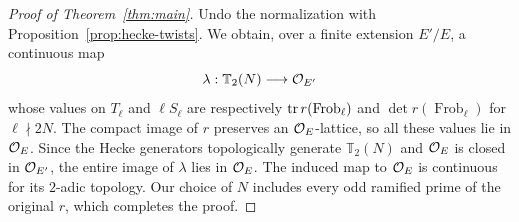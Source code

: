 \begin{proof}[Proof of Theorem~\ref{thm:main}]
Undo the normalization with Proposition~\ref{prop:hecke-twists}.
We obtain, over a finite extension $E'/E$, a continuous map
\[
 \lambda:\mathbb T_2(N)\longrightarrow\mathcal O_{E'}
\]
whose values on $T_\ell$ and $\ell S_\ell$ are respectively
$\operatorname{tr} r(\operatorname{Frob}_\ell)$ and
$\det r(\operatorname{Frob}_\ell)$ for $\ell\nmid2N$.
The compact image of $r$ preserves an $\mathcal O_E$-lattice, so all
these values lie in $\mathcal O_E$.  Since the Hecke generators
topologically generate $\mathbb T_2(N)$ and $\mathcal O_E$ is closed
in $\mathcal O_{E'}$, the entire image of $\lambda$ lies in $\mathcal O_E$.
The induced map to $\mathcal O_E$ is continuous for its $2$-adic topology.
Our choice of $N$ includes every odd ramified prime of the
original $r$, which completes the proof.
\end{proof}
